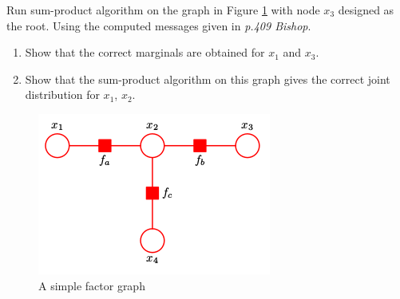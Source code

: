\documentclass{amsmlaj}
\begin{document}
\newpage

\begin{problem}
Run sum-product algorithm on the graph in Figure \ref{fig:simplegraph} with node
$x_3$ designed as the root. Using the computed messages given in \emph{p.409 Bishop}.
\begin{enumerate}
\item  Show that the correct marginals are obtained for $x_1$ and $x_3$.
\item Show that the sum-product algorithm on this graph gives the correct joint distribution for $x_1$, $x_2$.
\end{enumerate}

\begin{figure}[H]
\begin{center}
\includegraphics[width=.4\textwidth]{simplegraph.png}
\caption{A simple factor graph}
\label{fig:simplegraph}
\end{center}
\end{figure}


\end{problem}
\end{document}
